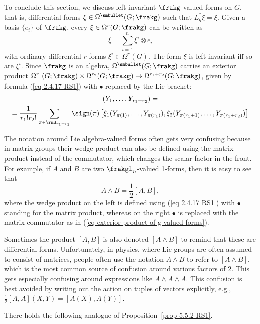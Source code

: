 To conclude this section, we discuss left-invariant $\frakg$-valued forms on $G$, that is, differential forms $\xi\in\Omega^{\smbullet }(G;\frakg)$ such that $L^\ast_g\xi=\xi$. Given a basis $\{e_i\}$ of $\frakg$, every $\xi\in\Omega^r(G;\frakg)$ can be written as
\[\xi=\sum_{i=1}^n\xi^i\otimes e_i\]
with ordinary differential $r$-forms $\xi^i\in\Omega^r(G)$. The form $\xi$ is left-invariant iff so are $\xi^i$. Since $\frakg$ is an algebra, $\Omega^{\smbullet }(G;\frakg)$ carries an exterior product $\Omega^{r_1}(G;\frakg)\times \Omega^{r_2}(G;\frakg)\to \Omega^{r_1+r_2}(G;\frakg)$, given by formula (\ref{eq 2.4.17 RS1}) with $\bullet$ replaced by the Lie bracket:
\begin{multline}
    [\xi_1, \xi_2](Y_1,\ldots,Y_{r_1+r_2})=\\
    =\frac{1}{r_1!r_2!}\sum_{\pi\in \rmS_{r_1+r_2}} \sign(\pi)\left[\xi_1(Y_{\pi(1)},\ldots,Y_{\pi(r_1)}), 
    \xi_2(Y_{\pi(r_1+1)},\ldots,Y_{\pi(r_1+r_2)})\right]\label{eq exterior product of g-valued forms}
\end{multline}


\begin{rem}\label{rem lie alg val forms}
    The notation around Lie algebra-valued forms often gets very confusing because in matrix groups their wedge product can also be defined using the matrix product instead of the commutator, which changes the scalar factor in the front. For example, if $A$ and $B$ are two $\frakgl_n$-valued 1-forms, then it is easy to see that
    \[A\wedge B=\frac12 [A,B],\]
    where the wedge product on the left is defined using (\ref{eq 2.4.17 RS1}) with $\bullet$ standing for the matrix product, whereas on the right $\bullet$ is replaced with the matrix commutator as in (\ref{eq exterior product of g-valued forms}).

    Sometimes the product $[A,B]$ is also denoted $[A\wedge B]$ to remind that these are differential forms. Unfortunately, in physics, where Lie groups are often assumed to consist of matrices, people often use the notation $A\wedge B$ to refer to $[A\wedge B]$, which is the most common source of confusion around various factors of $2$. This gets especially confusing around expressions like $A\wedge A\wedge A$. This confusion is best avoided by writing out the action on tuples of vectors explicitly, e.g., $\frac12[A,A](X,Y)=[A(X),A(Y)]$.
\end{rem}


There holds the following analogue of Proposition~\ref{prop 5.5.2 RS1}.


